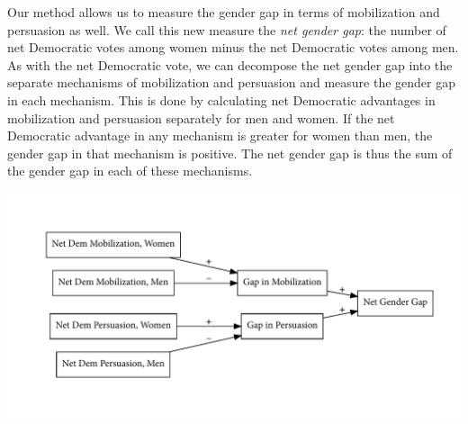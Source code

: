\documentclass[12pt
               ,final
               ]{article}
\begin{document}


Our method allows us to measure the gender gap in terms of mobilization and persuasion as well. We call this new measure the \emph{net gender gap}: the number of net Democratic votes among women minus the net Democratic votes among men. As with the net Democratic vote, we can decompose the net gender gap into the separate mechanisms of mobilization and persuasion and measure the gender gap in each mechanism. This is done by calculating net Democratic advantages in mobilization and persuasion separately for men and women. If the net Democratic advantage in any mechanism is greater for women than men, the gender gap in that mechanism is positive. The net gender gap is thus the sum of the gender gap in each of these mechanisms. 


\begin{center}
  \includegraphics[width = \textwidth]{diagrams/net-gap-mechanisms.pdf}
\end{center}
\end{document}
